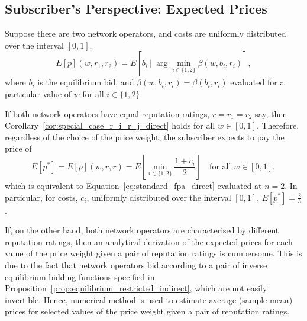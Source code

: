 \subsection{Subscriber's Perspective: Expected Prices} %
\label{sub:subscriber_s_perspective_expected_prices_indirect}
Suppose there are two network operators, and costs are uniformly distributed over the interval $[0,1]$. 
\begin{equation}
  \label{eq:exp_price_def_indirect}
  E[p](w,r_1,r_2) = E[b_i \:\vert\: \arg\min_{i\in \{1,2\}}\beta(w,b_i,r_i)],
\end{equation}
where $b_i$ is the equilibrium bid, and $\beta(w,b_i,r_i) = \beta(b_i,r_i)$ evaluated for a particular value of $w$ for all $i\in \{1,2\}$.

If both network operators have equal reputation ratings, $r = r_1 = r_2$ say, then Corollary~\ref{cor:special_case_r_i_r_j_direct} holds for all $w\in [0,1]$. Therefore, regardless of the choice of the price weight, the subscriber expects to pay the price of
\begin{equation}
  \label{eq:exp_price_at_w_1_indirect}
  E[p^*] = E[p](w,r,r) = E\left[\min_{i\in \{1,2\}}\frac{1+c_i}{2}\right] \quad\textrm{for all } w\in [0,1],
\end{equation}
which is equivalent to Equation~\eqref{eq:standard_fpa_direct} evaluated at $n=2$. In particular, for costs, $c_i$, uniformly distributed over the interval $[0,1]$, $E[p^*] = \frac{2}{3}$.

If, on the other hand, both network operators are characterised by different reputation ratings, then an analytical derivation of the expected prices for each value of the price weight given a pair of reputation ratings is cumbersome. This is due to the fact that network operators bid according to a pair of inverse equilibrium bidding functions specified in Proposition~\ref{prop:equilibrium_restricted_indirect}, which are not easily invertible. Hence, numerical method is used to estimate average (sample mean) prices for selected values of the price weight given a pair of reputation ratings.

